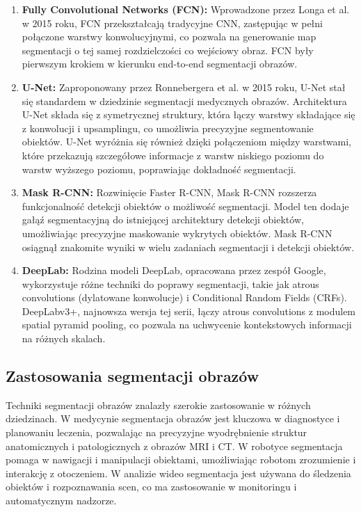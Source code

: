 \begin{enumerate}
    \item \textbf{Fully Convolutional Networks (FCN):} Wprowadzone przez Longa et al. w 2015 roku, 
    FCN przekształcają tradycyjne CNN, zastępując w pełni połączone warstwy konwolucyjnymi, co 
    pozwala na generowanie map segmentacji o tej samej rozdzielczości co wejściowy obraz. 
    FCN były pierwszym krokiem w kierunku end-to-end segmentacji obrazów. \cite{fcc}
    \item \textbf{U-Net:} Zaproponowany przez Ronnebergera et al. w 2015 roku, U-Net stał się 
    standardem w dziedzinie segmentacji medycznych obrazów. Architektura U-Net składa się z 
    symetrycznej struktury, która łączy warstwy składające się z konwolucji i upsamplingu, co 
    umożliwia precyzyjne segmentowanie obiektów. U-Net wyróżnia się również dzięki połączeniom 
    między warstwami, które przekazują szczegółowe informacje z warstw niskiego poziomu do warstw 
    wyższego poziomu, poprawiając dokładność segmentacji. \cite{unet}
    \item \textbf{Mask R-CNN:} Rozwinięcie Faster R-CNN, Mask R-CNN rozszerza funkcjonalność detekcji obiektów o możliwość segmentacji. 
    Model ten dodaje gałąź segmentacyjną do istniejącej architektury detekcji obiektów, 
    umożliwiając precyzyjne maskowanie wykrytych obiektów. Mask R-CNN osiągnął znakomite 
    wyniki w wielu zadaniach segmentacji i detekcji obiektów. \cite{mask}
    \item \textbf{DeepLab:} Rodzina modeli DeepLab, opracowana przez zespół Google, wykorzystuje 
    różne techniki do poprawy segmentacji, takie jak atrous convolutions (dylatowane konwolucje) i 
    Conditional Random Fields (CRFs). DeepLabv3+, najnowsza wersja tej serii, łączy atrous 
    convolutions z modulem spatial pyramid pooling, co pozwala na uchwycenie kontekstowych 
    informacji na różnych skalach. \cite{deeplab}
\end{enumerate}

\subsection*{Zastosowania segmentacji obrazów}

Techniki segmentacji obrazów znalazły szerokie zastosowanie w różnych dziedzinach. 
W medycynie segmentacja obrazów jest kluczowa w diagnostyce i planowaniu leczenia, 
pozwalając na precyzyjne wyodrębnienie struktur anatomicznych i patologicznych z obrazów MRI i CT. 
W robotyce segmentacja pomaga w nawigacji i manipulacji obiektami, umożliwiając robotom 
zrozumienie i interakcję z otoczeniem. W analizie wideo segmentacja jest używana do śledzenia 
obiektów i rozpoznawania scen, co ma zastosowanie w monitoringu i automatycznym nadzorze.

